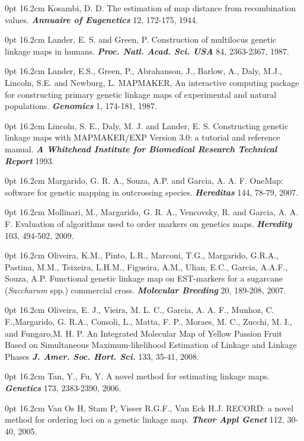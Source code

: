 \documentclass[letterpaper,12pt,oneside]{article}
\begin{document}
 0pt \linewidth 0.8cm 16.2cm
Kosambi, D. D. The estimation of map distance from recombination values. {\bf {\it Annuaire of Eugenetics}} 12, 172-175, 1944.

 0pt \linewidth 0.8cm 16.2cm
Lander, E. S. and Green, P. Construction of multilocus genetic linkage maps in humans. {\bf {\it Proc. Natl. Acad. Sci. USA}} 84, 2363-2367, 1987.

 0pt \linewidth 0.8cm 16.2cm
Lander, E.S., Green, P., Abrahanson, J., Barlow, A., Daly, M.J., Lincoln, S.E. and Newburg, L. MAPMAKER, An interactive computing package for constructing primary genetic linkage maps of experimental and natural populations. {\bf {\it Genomics}} 1, 174-181, 1987.

 0pt \linewidth 0.8cm 16.2cm
Lincoln, S. E., Daly, M. J. and Lander, E. S. Constructing genetic linkage maps with MAPMAKER/EXP Version 3.0: a tutorial and reference manual. {\bf {\it A Whitehead Institute for Biomedical Research Technical Report}} 1993.

 0pt \linewidth 0.8cm 16.2cm
Margarido, G. R. A., Souza, A.P. and Garcia, A. A. F. OneMap: software for genetic mapping in outcrossing species. {\bf {\it Hereditas}} 144, 78-79, 2007.

 0pt \linewidth 0.8cm 16.2cm
Mollinari, M., Margarido, G. R. A., Vencovsky, R. and Garcia, A. A. F. Evaluation of algorithms used to order markers on genetics maps. {\bf {\it Heredity}} 103, 494-502, 2009.

 0pt \linewidth 0.8cm 16.2cm
Oliveira, K.M., Pinto, L.R., Marconi, T.G., Margarido, G.R.A., Pastina, M.M., Teixeira, L.H.M., Figueira, A.M., Ulian, E.C., Garcia, A.A.F., Souza, A.P. Functional genetic linkage map on EST-markers for a sugarcane ({\it Saccharum} spp.) commercial cross. {\bf {\it Molecular Breeding}} 20, 189-208, 2007.

 0pt \linewidth 0.8cm 16.2cm
Oliveira, E. J., Vieira, M. L. C., Garcia, A. A. F., Munhoz, C. F.,Margarido, G. R.A., Consoli, L., Matta, F. P., Moraes, M. C., Zucchi, M. I., and Fungaro,M. H. P. An Integrated Molecular Map of Yellow Passion Fruit Based on Simultaneous Maximum-likelihood Estimation of Linkage and Linkage Phases {\bf {\it J. Amer. Soc. Hort. Sci.}} 133, 35-41, 2008. 

 0pt \linewidth 0.8cm 16.2cm
Tan, Y., Fu, Y. A novel method for estimating linkage maps. {\bf {\it Genetics}} 173, 2383-2390, 2006.

 0pt \linewidth 0.8cm 16.2cm
 Van Os H, Stam P, Visser R.G.F., Van Eck H.J. RECORD: a novel method for ordering loci on a genetic linkage map. {\bf {\it Theor Appl Genet}} 112, 30-40, 2005.
\end{document}
